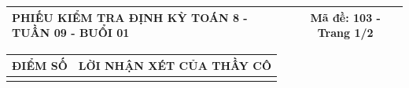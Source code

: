 \documentclass[12pt,a4paper]{article}
\begin{document}
\newpage
\noindent
\begin{tabularx}{\linewidth}{|X|c|}
\hline
\textbf{PHIẾU KIỂM TRA ĐỊNH KỲ TOÁN 8 - TUẦN 09 - BUỔI 01} & \textbf{Mã đề: 103 - Trang 1/2} \\
\hline
\end{tabularx}

\vspace{1.2mm}

\noindent
\begin{tabularx}{\linewidth}{|p{3.2cm}|X|}
\hline
\centering\textbf{ĐIỂM SỐ} & \centering\textbf{LỜI NHẬN XÉT CỦA THẦY CÔ} \tabularnewline
\hline
\rule{0pt}{1.8cm} & \tabularnewline
\hline
\end{tabularx}
\end{document}
